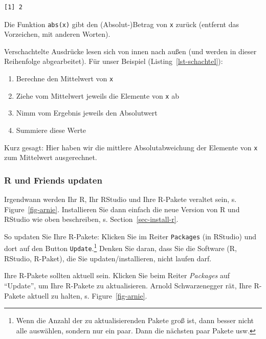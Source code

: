 \documentclass[
  letterpaper,
  DIV=11,
  numbers=noendperiod]{scrartcl}
\providecommand{\tightlist}{%
  \setlength{\itemsep}{0pt}\setlength{\parskip}{0pt}}\usepackage{longtable,booktabs,array}
\theoremstyle{definition}
\theoremstyle{definition}
\theoremstyle{definition}
\theoremstyle{remark}
\begin{document}
\begin{verbatim}
[1] 2
\end{verbatim}

Die Funktion \texttt{abs(x)} gibt den (Absolut-)Betrag von \texttt{x}
zurück (entfernt das Vorzeichen, mit anderen Worten).

Verschachtelte Ausdrücke lesen sich von innen nach außen (und werden in
dieser Reihenfolge abgearbeitet). Für unser Beispiel
(Listing~\ref{lst-schachtel}):

\begin{enumerate}
\def\labelenumi{\arabic{enumi}.}
\tightlist
\item
  Berechne den Mittelwert von \texttt{x}
\item
  Ziehe vom Mittelwert jeweils die Elemente von \texttt{x} ab
\item
  Nimm vom Ergebnis jeweils den Absolutwert
\item
  Summiere diese Werte
\end{enumerate}

Kurz gesagt: Hier haben wir die mittlere Absolutabweichung der Elemente
von \texttt{x} zum Mittelwert ausgerechnet.

\subsubsection{R und Friends updaten}\label{r-und-friends-updaten}

Irgendwann werden Ihr R, Ihr RStudio und Ihre R-Pakete veraltet sein, s.
Figure~\ref{fig-arnie}. Installieren Sie dann einfach die neue Version
von R und RStudio wie oben beschreiben, s. Section~\ref{sec-install-r}.

So updaten Sie Ihre R-Pakete: Klicken Sie im Reiter \texttt{Packages}
(in RStudio) und dort auf den Button \texttt{Update}.\footnote{Wenn die
  Anzahl der zu aktualisierenden Pakete groß ist, dann besser nicht alle
  auswählen, sondern nur ein paar. Dann die nächsten paar Pakete usw.}
Denken Sie daran, dass Sie die Software (R, RStudio, R-Paket), die Sie
updaten/installieren, nicht laufen darf.

\begin{tcolorbox}[enhanced jigsaw, coltitle=black, colframe=quarto-callout-note-color-frame, opacityback=0, toprule=.15mm, opacitybacktitle=0.6, arc=.35mm, titlerule=0mm, toptitle=1mm, title=\textcolor{quarto-callout-note-color}{\faInfo}\hspace{0.5em}{Note}, bottomtitle=1mm, leftrule=.75mm, breakable, rightrule=.15mm, colbacktitle=quarto-callout-note-color!10!white, bottomrule=.15mm, colback=white, left=2mm]

Ihre R-Pakete sollten aktuell sein. Klicken Sie beim Reiter
\emph{Packages} auf ``Update'', um Ihre R-Pakete zu aktualisieren.
Arnold Schwarzenegger rät, Ihre R-Pakete aktuell zu halten, s.
Figure~\ref{fig-arnie}\footnotemark{}.

\end{tcolorbox}
\end{document}
